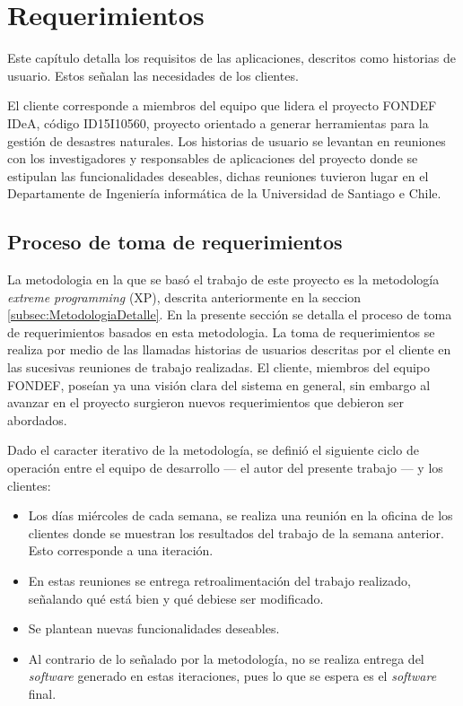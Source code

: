 \chapter{Requerimientos}
\label{cap:Requerimientos}

Este capítulo detalla los requisitos de las aplicaciones, descritos como historias de usuario. Estos señalan las necesidades de los clientes.

El cliente corresponde a miembros del equipo que lidera el proyecto FONDEF IDeA, código ID15I10560, proyecto orientado a generar herramientas para la gestión de desastres naturales. Los historias de usuario se levantan en reuniones con los investigadores y responsables de aplicaciones del proyecto donde se estipulan las funcionalidades deseables, dichas reuniones tuvieron lugar en el Departamente de Ingeniería informática de la Universidad de Santiago e Chile.

\section{Proceso de toma de requerimientos}
\label{sec:tomaDeRequerimientos}

La metodologia en la que se basó el trabajo de este proyecto es la metodología \textit{extreme programming} (XP), descrita anteriormente en la seccion \ref{subsec:MetodologiaDetalle}. En la presente sección se detalla el proceso de toma de requerimientos basados en esta metodologia. La toma de requerimientos se realiza por medio de las llamadas historias de usuarios descritas por el cliente en las sucesivas reuniones de trabajo realizadas.
El cliente, miembros del equipo FONDEF, poseían ya una visión clara del sistema en general, sin embargo al avanzar en el proyecto surgieron nuevos requerimientos que debieron ser abordados.

Dado el caracter iterativo de la metodología, se definió el siguiente ciclo de operación entre el equipo de desarrollo — el autor del presente trabajo — y los clientes:

\begin{itemize}
\item Los días miércoles de cada semana, se realiza una reunión en la oficina de los clientes donde se muestran los resultados del trabajo de la semana anterior. Esto corresponde a una iteración.
\item En estas reuniones se entrega retroalimentación del trabajo realizado, señalando qué está bien y qué debiese ser modificado.
\item Se plantean nuevas funcionalidades deseables.
\item Al contrario de lo señalado por la metodología, no se realiza entrega del \textit{software} generado en estas iteraciones, pues lo que se espera es el \textit{software} final.
\end{itemize}

